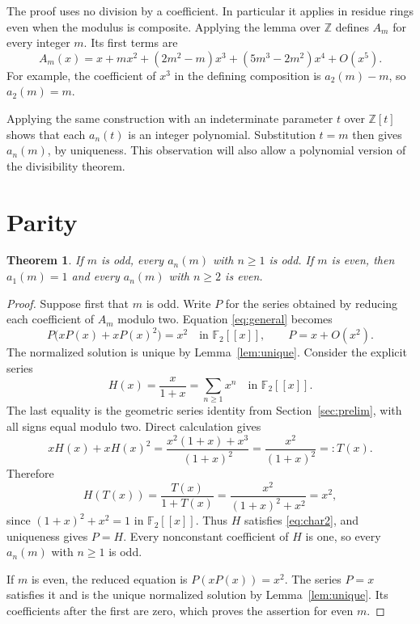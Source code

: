 \documentclass[11pt,a4paper]{article}
\newtheorem{theorem}{Theorem}[section]
\theoremstyle{remark}\newtheorem{remark}[theorem]{Remark}
\newcommand{\Z}{\mathbb Z}
\newcommand{\F}{\mathbb F}
\begin{document}
The proof uses no division by a coefficient. In particular it applies in
residue rings even when the modulus is composite. Applying the lemma over
$\Z$ defines $A_m$ for every integer $m$. Its first terms are
\begin{equation}\label{eq:first}
 A_m(x)=x+mx^2+(2m^2-m)x^3+(5m^3-2m^2)x^4+O(x^5).
\end{equation}
For example, the coefficient of $x^3$ in the defining composition is
$a_2(m)-m$, so $a_2(m)=m$.

Applying the same construction with an indeterminate parameter $t$ over
$\Z[t]$ shows that each $a_n(t)$ is an integer polynomial. Substitution
$t=m$ then gives $a_n(m)$, by uniqueness. This observation will also allow
a polynomial version of the divisibility theorem.

\section{Parity}

\begin{theorem}\label{thm:parity}
If $m$ is odd, every $a_n(m)$ with $n\ge1$ is odd. If $m$ is even, then
$a_1(m)=1$ and every $a_n(m)$ with $n\ge2$ is even.
\end{theorem}

\begin{proof}
Suppose first that $m$ is odd. Write $P$ for the series obtained by reducing
each coefficient of $A_m$ modulo two. Equation \eqref{eq:general} becomes
\begin{equation}\label{eq:char2}
 P\bigl(xP(x)+xP(x)^2\bigr)=x^2
 \quad\text{in }\F_2[[x]],\qquad P=x+O(x^2).
\end{equation}
The normalized solution is unique by Lemma~\ref{lem:unique}.
Consider the explicit series
\[
 H(x)=\frac{x}{1+x}=\sum_{n\ge1}x^n\quad\text{in }\F_2[[x]].
\]
The last equality is the geometric series identity from
Section~\ref{sec:prelim}, with all signs equal modulo two.
Direct calculation gives
\[
 xH(x)+xH(x)^2
 =\frac{x^2(1+x)+x^3}{(1+x)^2}
 =\frac{x^2}{(1+x)^2}=:T(x).
\]
Therefore
\[
 H(T(x))=\frac{T(x)}{1+T(x)}
 =\frac{x^2}{(1+x)^2+x^2}=x^2,
\]
since $(1+x)^2+x^2=1$ in $\F_2[[x]]$.
Thus $H$ satisfies \eqref{eq:char2}, and uniqueness gives $P=H$.
Every nonconstant coefficient of $H$ is one, so every $a_n(m)$ with
$n\ge1$ is odd.

If $m$ is even, the reduced equation is $P(xP(x))=x^2$.
The series $P=x$ satisfies it and is the unique normalized solution by
Lemma~\ref{lem:unique}. Its coefficients after the first are zero,
which proves the assertion for even $m$.
\end{proof}
\end{document}
